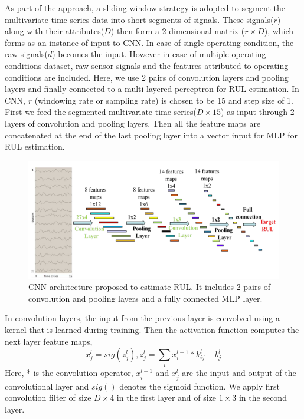 As part of the approach, a sliding window strategy is adopted to segment the multivariate time series data into short segments of signals. These signals($r$) along with their attributes($D$) then form a 2 dimensional  matrix ($r \times D$), which forms as an instance of input to CNN. In case of single operating condition, the raw signals($d$) becomes the input. However in case of multiple operating conditions dataset, raw sensor signals and the features attributed to operating conditions are included. Here, we use 2 pairs of convolution layers and pooling layers and finally connected to a multi layered perceptron for RUL estimation. In CNN, $r$ (windowing rate or sampling rate) is chosen to be 15 and step size of 1. First we feed the segmented multivariate time series($D \times 15$) as input through 2 layers of convolution and pooling layers. Then all the feature maps are concatenated at the end of the last pooling layer into a vector input for MLP for RUL estimation.
\begin{figure}[ht]
    \includegraphics[width=\textwidth]{gfx/rul_cnn_architecture}
    \caption{CNN architecture proposed to estimate RUL. It includes 2 pairs of convolution and pooling layers and a fully connected MLP layer. \cite{DBLP:conf/dasfaa/BabuZL16}}
    \label{fig:cnn_archi_rul}
\end{figure}

In convolution layers, the input from the previous layer is convolved using a kernel that is learned during training. Then the activation function computes the next layer feature maps,
\begin{equation}
    x_{j}^{l} = sig(z_{j}^{l}),    z_{j}^{l} = \sum_{i}x_{i}^{l-1} * k_{ij}^{l} + b^{l}_{j}
\end{equation}
Here, * is the convolution operator, $x_{i}^{l-1}$ and $x_{j}^{l}$ are the input and output of the convolutional layer and $sig()$ denotes the sigmoid function. We apply first convolution filter of size $D \times 4$ in the first layer and of size $1 \times 3$ in the second layer.

